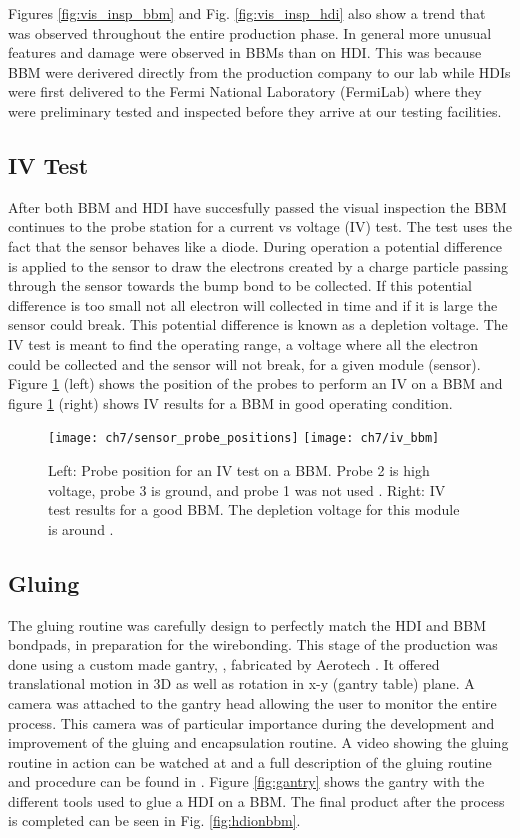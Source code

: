 Figures \ref{fig:vis_insp_bbm} and Fig. \ref{fig:vis_insp_hdi} also show a trend that was observed throughout the entire production phase. In general more unusual features and damage were observed in BBMs than on HDI. This was because BBM were derivered directly from the production company to our lab while HDIs were first delivered to the Fermi National Laboratory (FermiLab) where they were preliminary tested and inspected before they arrive at our testing facilities. 

\subsection{IV Test}\label{ivbbm}
After both BBM and HDI have succesfully passed the visual inspection the BBM continues to the probe station for a current vs voltage (IV) test. The test uses the fact that the sensor behaves like a diode. During operation a potential difference is applied to the sensor to draw the electrons created by a charge particle passing through the sensor towards the bump bond to be collected. If this potential difference is too small not all electron will collected in time and if it is large the sensor could break. This potential difference is known as a depletion voltage. The IV test is meant to find the operating range, a voltage where all the electron could be collected and the sensor will not break, for a given module (sensor). Figure \ref{fig:sensor_probe_positions} (left) shows the position of the probes to perform an IV on a BBM and figure \ref{fig:sensor_probe_positions} (right) shows IV results for a BBM in good operating condition.  

\begin{figure}[!h]
	\centering
	\texttt{[image: ch7/sensor\_probe\_positions]}
	\texttt{[image: ch7/iv\_bbm]}
	\caption[IV test of BBM]{Left: Probe position for an IV test on a BBM. Probe 2 is high voltage, probe 3 is ground, and probe 1 was not used \cite{ph1_sop}. Right: IV test results for a good BBM. The depletion voltage for this module is around {}.}
	\label{fig:sensor_probe_positions}
\end{figure}

\subsection{Gluing}
The gluing routine was carefully design to perfectly match the HDI and BBM bondpads, in preparation for the wirebonding. This stage of the production was done using a custom made gantry, , fabricated by Aerotech \cite{aerotech}. It offered translational motion in 3D as well as rotation in x-y (gantry table) plane. A camera was attached to the gantry head allowing the user to monitor the entire process. This camera was of particular importance during the development and improvement of the gluing and encapsulation routine. A video showing the gluing routine in action can be watched at \cite{gluing_frank} and a full description of the gluing routine and procedure can be found in \cite{and_the}. Figure \ref{fig:gantry} shows the gantry with the different tools used to glue a HDI on a BBM. The final product after the process is completed can be seen in Fig. \ref{fig:hdionbbm}.

